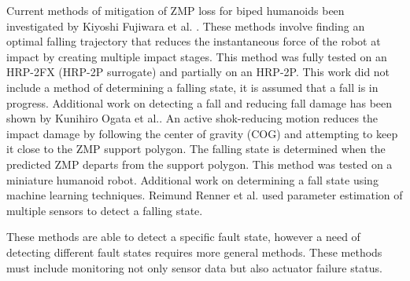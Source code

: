 Current methods of mitigation of ZMP loss for biped humanoids been investigated by Kiyoshi Fujiwara et al. \cite{4115653}.  These methods involve finding an optimal falling trajectory that reduces the instantaneous force of the robot at impact by creating multiple impact stages\cite{4399327}.  This method was fully tested on an HRP-2FX (HRP-2P surrogate) and partially on an HRP-2P.  This work did not include a method of determining a falling state, it is assumed that a fall is in progress.  Additional work on detecting a fall and reducing fall damage has been shown by Kunihiro Ogata et al.\cite{4755950}.  An active shok-reducing motion reduces the impact damage by following the center of gravity (COG) and attempting to keep it close to the ZMP support polygon.  The falling state is determined when the predicted ZMP departs from the support polygon. This method was tested on a miniature humanoid robot.  Additional work on determining a fall state using machine learning techniques\cite{4813885}.  Reimund Renner et al. used parameter estimation of multiple sensors to detect a falling state\cite{4058847}.

These methods are able to detect a specific fault state, however a need of detecting different fault states requires more general methods.  These methods must include monitoring not only sensor data but also actuator failure status.  